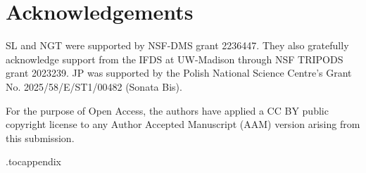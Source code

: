 \documentclass[10pt]{article}
\theoremstyle{definition}
\theoremstyle{definition}
\numberwithin{equation}{section}
\begin{document}
\section*{Acknowledgements}
SL and NGT were supported by NSF-DMS grant 2236447. They also gratefully acknowledge support from the IFDS at UW-Madison through NSF TRIPODS
grant 2023239. JP was supported by the Polish National Science Centre’s Grant No. 2025/58/E/ST1/00482 (Sonata Bis).

For the purpose of Open Access, the authors have applied a CC BY public copyright license to any Author Accepted Manuscript (AAM) version arising from this submission. %




\newpage
\appendix
\clearpage
{}
{}

\etocdepthtag.toc{appendix}

\begingroup
{}
\tableofcontents
\endgroup
\end{document}
